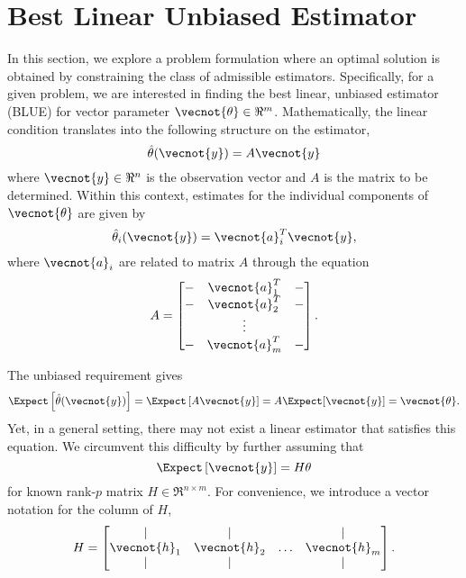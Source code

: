 \section{Best Linear Unbiased Estimator}

In this section, we explore a problem formulation where an optimal solution is obtained by constraining the class of admissible estimators.
Specifically, for a given problem, we are interested in finding the best linear, unbiased estimator (BLUE) for vector parameter $\vecnot{\theta} \in \Re^m$.
Mathematically, the linear condition translates into the following structure on the estimator,
\begin{equation*}
\hat{\theta} (\vecnot{y}) = A \vecnot{y}
\end{equation*}
where $\vecnot{y} \in \Re^n$ is the observation vector and $A$ is the matrix to be determined.
Within this context, estimates for the individual components of $\vecnot{\theta}$ are given by
\begin{equation*}
\hat{\theta}_i (\vecnot{y}) = \vecnot{a}_i^T \vecnot{y} ,
\end{equation*}
where $\vecnot{a}_i$ are related to matrix $A$ through the equation
\begin{equation*}
A = \begin{bmatrix}
- & \vecnot{a}_1^T & - \\
- & \vecnot{a}_2^T & - \\
& \vdots & \\
- & \vecnot{a}_m^T & - \\
\end{bmatrix} .
\end{equation*}

The unbiased requirement gives
\begin{equation*}
\Expect \left[ \hat{\theta} (\vecnot{y}) \right]
= \Expect \left[ A \vecnot{y} \right]
= A \Expect [ \vecnot{y} ] = \vecnot{\theta} .
\end{equation*}
Yet, in a general setting, there may not exist a linear estimator that satisfies this equation.
We circumvent this difficulty by further assuming that
\begin{equation*}
\Expect \left[ \vecnot{y} \right] = H \theta
\end{equation*}
for known rank-$p$ matrix $H \in \Re^{n \times m}$.
For convenience, we introduce a vector notation for the column of $H$,
\begin{equation*}
H = \begin{bmatrix} | & | & & | \\
\vecnot{h}_1 & \vecnot{h}_2 & \hdots & \vecnot{h}_m  \\
| & | & & | \end{bmatrix} .
\end{equation*}

